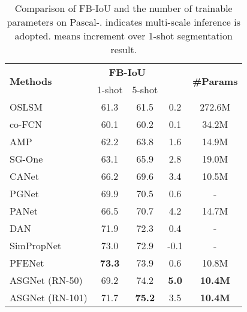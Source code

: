 \begin{table}[htbp] \small
\begin{center}
\begin{tabular}{|l|cc|c|c|}
\hline
\multirow{2}{*}{\textbf{Methods}} & \multicolumn{2}{c|}{\textbf{FB-IoU}} & \multirow{2}{*}{} & \multirow{2}{*}{\textbf{\#Params}} \\ \cline{2-3}
                                  & 1-shot             & 5-shot         &                   &                                    \\ \hline\hline
OSLSM \cite{oslsm}                            & 61.3               & 61.5           & 0.2               & 272.6M                             \\
co-FCN \cite{co-fcn}                           & 60.1               & 60.2           & 0.1               & 34.2M                              \\
AMP \cite{amp}                              & 62.2               & 63.8           & 1.6               & 14.9M                              \\
SG-One \cite{sgone}                            & 63.1               & 65.9           & 2.8               & 19.0M                              \\
CANet \cite{canet}                            & 66.2               & 69.6           & 3.4               & 10.5M                              \\
PGNet \cite{pgnet}                           & 69.9               & 70.5           & 0.6               & -                             \\
PANet \cite{panet}                            & 66.5               & 70.7           & 4.2               & 14.7M                              \\ 
DAN \cite{danet}                            & 71.9               & 72.3           & 0.4               & -      \\
SimPropNet \cite{simprop}                            & 73.0               & 72.9           & -0.1               & -                              \\
PFENet \cite{pfenet}                            & \textbf{73.3}               & 73.9           & 0.6               & 10.8M                              \\ \hline
ASGNet (RN-50)                            & 69.2          & 74.2               &  \textbf{5.0}                 & \textbf{10.4M}    \\
ASGNet (RN-101)                            & 71.7          & \textbf{75.2}               & 3.5                 & \textbf{10.4M}     \\ \hline
\end{tabular}
\end{center}
\caption{Comparison of FB-IoU and the number of trainable parameters on Pascal-.  indicates multi-scale inference is adopted.  means increment over 1-shot segmentation result.}
\vspace{-3mm}
\label{pascal_fb}
\end{table}

